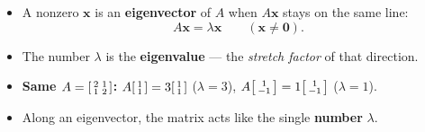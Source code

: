 \documentclass[aspectratio=169, 11pt]{beamer}
\newcommand{\xx}{\mathbf{x}}
\begin{document}
\begin{frame}[t, plain]
  \begin{itemize}
    \setlength{\itemsep}{6pt}
    \item A nonzero $\xx$ is an \textbf{eigenvector} of $A$ when $A\xx$ stays on the same line:
          \[ A\xx = \lambda\xx \qquad (\xx\ne\mathbf{0}). \]
    \item The number $\lambda$ is the \textbf{eigenvalue} --- the \emph{stretch factor} of that direction.
    \item \textbf{Same $A=\begin{bsmallmatrix} 2 & 1\\ 1 & 2 \end{bsmallmatrix}$:}
          $A\begin{bsmallmatrix} 1\\1 \end{bsmallmatrix}=3\begin{bsmallmatrix} 1\\1 \end{bsmallmatrix}$
          ($\lambda=3$), \quad
          $A\begin{bsmallmatrix} 1\\-1 \end{bsmallmatrix}=1\begin{bsmallmatrix} 1\\-1 \end{bsmallmatrix}$
          ($\lambda=1$).
    \item Along an eigenvector, the matrix acts like the single \textbf{number} $\lambda$.
  \end{itemize}
\end{frame}
\end{document}
